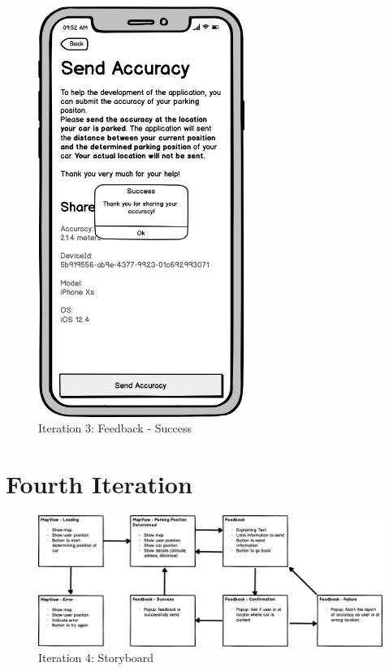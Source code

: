 \begin{figure}[H]
  \centering
  \begin{minipage}[b]{0.45\textwidth}
    \centering
    \includegraphics[width=0.6\textwidth]{images/UI/Iteration3-Feedback-Success.png}
    \caption{Iteration 3: Feedback - Success}
    \label{fig:i3-feedback-succ}
  \end{minipage}
  \hfill
  \begin{minipage}[b]{0.45\textwidth}
    
  \end{minipage}
\end{figure}

\section*{Fourth Iteration}

\begin{figure}[H]
    \centering
    \includegraphics[width=\textwidth]{images/UI/Iteration4-Overview.png}
    \caption{Iteration 4: Storyboard}
    \label{fig:i4story}
\end{figure}


